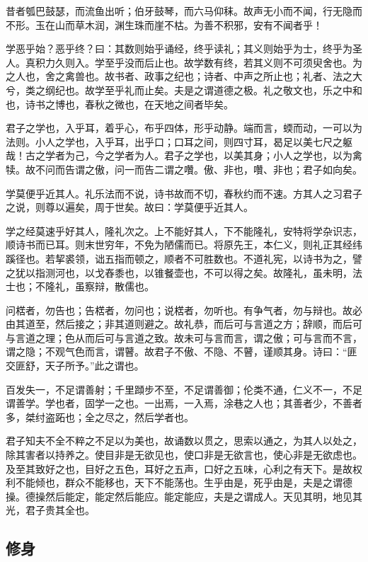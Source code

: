 \documentclass[]{article}
\begin{document}
昔者瓠巴鼓瑟，而流鱼出听；伯牙鼓琴，而六马仰秣。故声无小而不闻，行无隐而不形。玉在山而草木润，渊生珠而崖不枯。为善不积邪，安有不闻者乎！

学恶乎始？恶乎终？曰：其数则始乎诵经，终乎读礼；其义则始乎为士，终乎为圣人。真积力久则入。学至乎没而后止也。故学数有终，若其义则不可须臾舍也。为之人也，舍之禽兽也。故书者、政事之纪也；诗者、中声之所止也；礼者、法之大兮，类之纲纪也。故学至乎礼而止矣。夫是之谓道德之极。礼之敬文也，乐之中和也，诗书之博也，春秋之微也，在天地之间者毕矣。

君子之学也，入乎耳，着乎心，布乎四体，形乎动静。端而言，蝡而动，一可以为法则。小人之学也，入乎耳，出乎口；口耳之间，则四寸耳，曷足以美七尺之躯哉！古之学者为己，今之学者为人。君子之学也，以美其身；小人之学也，以为禽犊。故不问而告谓之傲，问一而告二谓之囋。傲、非也，囋、非也；君子如向矣。

学莫便乎近其人。礼乐法而不说，诗书故而不切，春秋约而不速。方其人之习君子之说，则尊以遍矣，周于世矣。故曰：学莫便乎近其人。

学之经莫速乎好其人，隆礼次之。上不能好其人，下不能隆礼，安特将学杂识志，顺诗书而已耳。则末世穷年，不免为陋儒而已。将原先王，本仁义，则礼正其经纬蹊径也。若挈裘领，诎五指而顿之，顺者不可胜数也。不道礼宪，以诗书为之，譬之犹以指测河也，以戈舂黍也，以锥餐壶也，不可以得之矣。故隆礼，虽未明，法士也；不隆礼，虽察辩，散儒也。

问楛者，勿告也；告楛者，勿问也；说楛者，勿听也。有争气者，勿与辩也。故必由其道至，然后接之；非其道则避之。故礼恭，而后可与言道之方；辞顺，而后可与言道之理；色从而后可与言道之致。故未可与言而言，谓之傲；可与言而不言，谓之隐；不观气色而言，谓瞽。故君子不傲、不隐、不瞽，谨顺其身。诗曰：``匪交匪舒，天子所予。''此之谓也。

百发失一，不足谓善射；千里蹞步不至，不足谓善御；伦类不通，仁义不一，不足谓善学。学也者，固学一之也。一出焉，一入焉，涂巷之人也；其善者少，不善者多，桀纣盗跖也；全之尽之，然后学者也。

君子知夫不全不粹之不足以为美也，故诵数以贯之，思索以通之，为其人以处之，除其害者以持养之。使目非是无欲见也，使口非是无欲言也，使心非是无欲虑也。及至其致好之也，目好之五色，耳好之五声，口好之五味，心利之有天下。是故权利不能倾也，群众不能移也，天下不能荡也。生乎由是，死乎由是，夫是之谓德操。德操然后能定，能定然后能应。能定能应，夫是之谓成人。天见其明，地见其光，君子贵其全也。

\hypertarget{header-n16}{%
\subsection{修身}\label{header-n16}}
\end{document}
